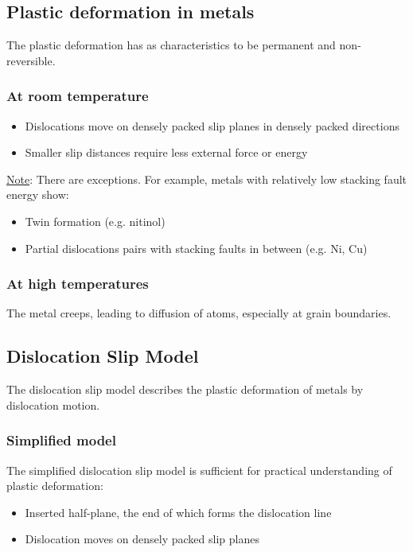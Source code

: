 \documentclass{article}
\begin{document}
\subsection{Plastic deformation in metals}
The plastic deformation has as characteristics to be permanent and non-reversible.

\subsubsection{At room temperature}
\begin{itemize}
  \item Dislocations move on densely packed slip planes in densely packed directions
  \item Smaller slip distances require less external force or energy
\end{itemize}

\underline{Note}: There are exceptions. For example, metals with relatively low stacking
fault energy show:
\begin{itemize}
  \item Twin formation (e.g. nitinol)
  \item Partial dislocations pairs with stacking faults in between (e.g. Ni, Cu)
\end{itemize}

\subsubsection{At high temperatures}
The metal creeps, leading to diffusion of atoms, especially at grain boundaries.

\newpage
\subsection{Dislocation Slip Model}
The dislocation slip model describes the plastic deformation of metals by dislocation motion.

\subsubsection{Simplified model}
The simplified dislocation slip model is sufficient for practical understanding of plastic deformation:
\begin{itemize}
  \item Inserted half-plane, the end of which forms the dislocation line
  \item Dislocation moves on densely packed slip planes
\end{itemize}
\end{document}
